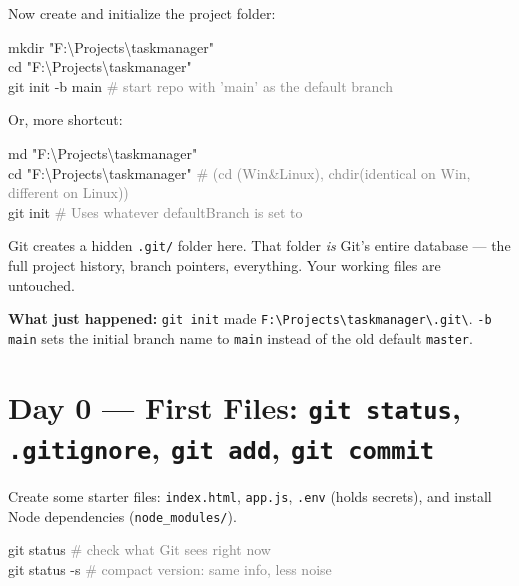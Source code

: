 \documentclass[10pt,a4paper]{article}
\newenvironment{codebox}{%
  \begin{mdframed}[backgroundcolor=codebg, linewidth=0pt,
    innerleftmargin=6pt, innerrightmargin=6pt,
    innertopmargin=4pt, innerbottommargin=4pt]%
  \small\ttfamily
}{%
  \end{mdframed}%
}
\newenvironment{notebox}{%
  \begin{mdframed}[backgroundcolor=notebg, linewidth=0.6pt,
    innerleftmargin=6pt, innerrightmargin=6pt,
    innertopmargin=3pt, innerbottommargin=3pt]%
  \small
}{%
  \end{mdframed}%
}
\newcommand{\cmd}[1]{\texttt{\small #1}}
\begin{document}
Now create and initialize the project folder:

\begin{codebox}
mkdir "F:\textbackslash Projects\textbackslash taskmanager"\\
cd    "F:\textbackslash Projects\textbackslash taskmanager"\\
git init -b main          \textcolor{gray}{\# start repo with 'main' as the default branch }
\end{codebox}

Or, more shortcut:

\begin{codebox}
md    "F:\textbackslash Projects\textbackslash taskmanager" \\
cd    "F:\textbackslash Projects\textbackslash taskmanager" \textcolor{gray}{\# (cd (Win\&Linux), chdir(identical on Win, different on Linux))} \\
git init          \textcolor{gray}{\# Uses whatever defaultBranch is set to}
\end{codebox}

Git creates a hidden \texttt{.git/} folder here. That folder \emph{is} Git's entire database ---
the full project history, branch pointers, everything. Your working files are untouched.

\begin{notebox}
\textbf{What just happened:} \cmd{git init} made \texttt{F:\textbackslash Projects\textbackslash taskmanager\textbackslash .git\textbackslash}.
\cmd{-b main} sets the initial branch name to \texttt{main} instead of the old default \texttt{master}.
\end{notebox}

\section{Day 0 --- First Files: \texttt{git status}, \texttt{.gitignore}, \texttt{git add}, \texttt{git commit}}

Create some starter files: \texttt{index.html}, \texttt{app.js}, \texttt{.env} (holds secrets),
and install Node dependencies (\texttt{node\_modules/}).

\begin{codebox}
git status          \textcolor{gray}{\# check what Git sees right now}\\
git status -s       \textcolor{gray}{\# compact version: same info, less noise}
\end{codebox}
\end{document}
